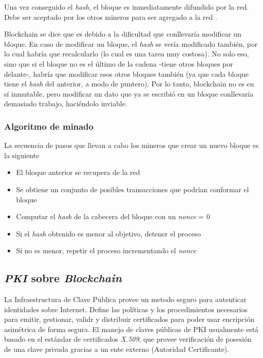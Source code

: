 Una vez conseguido el \emph{hash}, el bloque es inmediatamente difundido por la red. Debe ser aceptado por los otros mineros para ser agregado a la red \autocite{MasteringBlockchainProofOfWork}. 

Blockchain se dice que es  debido a la dificultad que conllevaría modificar un bloque. En caso de modificar un bloque, el \emph{hash} se vería modificado también, por lo cual habría que recalcularlo (lo cual es una tarea muy costosa). No solo eso, sino que si el bloque no es el último de la cadena -tiene otros bloques por delante-, habría que modificar esos otros bloques también (ya que cada bloque tiene el \emph{hash} del anterior, a modo de puntero). Por lo tanto, blockchain no es en sí inmutable, pero modificar un dato que ya se escribió en un bloque conllevaría demasiado trabajo, haciéndolo inviable.

\subsubsection*{Algoritmo de minado}

La secuencia de pasos que llevan a cabo los mineros que crear un nuevo bloque es la siguiente \autocite{MasteringBlockchainMiningAlgorithm}

\begin{itemize}
    \item El bloque anterior se recupera de la red
    \item Se obtiene un conjunto de posibles transacciones que podrían conformar el bloque
    \item Computar el \emph{hash} de la cabecera del bloque con un \emph{nonce} = 0 
    \item Si el \emph{hash} obtenido es menor al objetivo, detener el proceso
    \item Si no es menor, repetir el proceso incrementando el \emph{nonce} 
\end{itemize}

\subsection{\emph{PKI} sobre \emph{Blockchain}}
La Infraestructura de Clave Publica provee un metodo seguro para autenticar identidades sobre Internet. Define las políticas y los procedimientos necesarios para emitir, gestionar, validr y distribuir certificados para poder usar encripción asimétrica de forma segura. El manejo de claves públicas de PKI usualmente está basado en el estándar de certificados \emph{X.509}, que provee verificación de posesión de una clave privada gracias a un ente externo (Autoridad Certificante).

